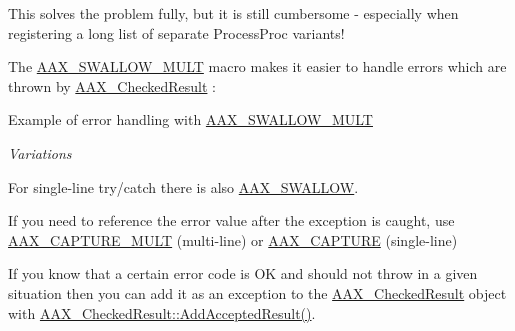  This solves the problem fully, but it is still cumbersome -\/ especially when registering a long list of separate Process\+Proc variants!

 The \mbox{\hyperlink{a00497_aef6db72a3774d079609f94720928cdd6}{A\+A\+X\+\_\+\+S\+W\+A\+L\+L\+O\+W\+\_\+\+M\+U\+LT}} macro makes it easier to handle errors which are thrown by \mbox{\hyperlink{a01601}{A\+A\+X\+\_\+\+Checked\+Result}} \+:


\begin{DoxyCode}{0}
\DoxyCodeLine{}
\DoxyCodeLine{\textcolor{comment}{// effect 1 registration}}
\DoxyCodeLine{);}
\DoxyCodeLine{}
\DoxyCodeLine{\textcolor{comment}{// effect 2 registration}}
\DoxyCodeLine{);}
\end{DoxyCode}
 Example of error handling with \mbox{\hyperlink{a00497_aef6db72a3774d079609f94720928cdd6}{A\+A\+X\+\_\+\+S\+W\+A\+L\+L\+O\+W\+\_\+\+M\+U\+LT}}

 {\itshape Variations}
\begin{DoxyItemize}
\item For single-\/line try/catch there is also \mbox{\hyperlink{a00497_a8f177823e9388c5163d1b402a9069bce}{A\+A\+X\+\_\+\+S\+W\+A\+L\+L\+OW}}.
\item If you need to reference the error value after the exception is caught, use \mbox{\hyperlink{a00497_a078be92d3d19a5a4b3da2b55ae5ac1c9}{A\+A\+X\+\_\+\+C\+A\+P\+T\+U\+R\+E\+\_\+\+M\+U\+LT}} (multi-\/line) or \mbox{\hyperlink{a00497_af9972551e4546e894010f99eade68c94}{A\+A\+X\+\_\+\+C\+A\+P\+T\+U\+RE}} (single-\/line)
\item If you know that a certain error code is OK and should not throw in a given situation then you can add it as an exception to the \mbox{\hyperlink{a01601}{A\+A\+X\+\_\+\+Checked\+Result}} object with \mbox{\hyperlink{a01601_af6c4b10c55e959f5f8424514a3cbb68a}{A\+A\+X\+\_\+\+Checked\+Result\+::\+Add\+Accepted\+Result()}}.
\end{DoxyItemize}

